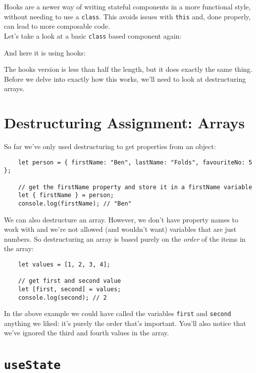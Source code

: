 Hooks are a newer way of writing stateful components in a more functional style, without needing to use a \texttt{class}. This avoids issues with \texttt{this} and, done properly, can lead to more composable code.
\\

Let's take a look at a basic \texttt{class} based component again:


And here it is using hooks:


The hooks version is less than half the length, but it does exactly the same thing.
\\

Before we delve into exactly how this works, we'll need to look at destructuring arrays.

\section{Destructuring Assignment: Arrays}
So far we've only used destructuring to get properties from an object:

\begin{verbatim}
    let person = { firstName: "Ben", lastName: "Folds", favouriteNo: 5 };

    // get the firstName property and store it in a firstName variable
    let { firstName } = person;
    console.log(firstName); // "Ben"
\end{verbatim}

We can also destructure an array. However, we don't have property names to work with and we're not allowed (and wouldn't want) variables that are just numbers. So destructuring an array is based purely on the \textit{order} of the items in the array:

\begin{verbatim}
    let values = [1, 2, 3, 4];

    // get first and second value
    let [first, second] = values;
    console.log(second); // 2
\end{verbatim}

In the above example we could have called the variables \texttt{first} and \texttt{second} anything we liked: it's purely the order that's important. You'll also notice that we've ignored the third and fourth values in the array.


\section{\texttt{useState}}

